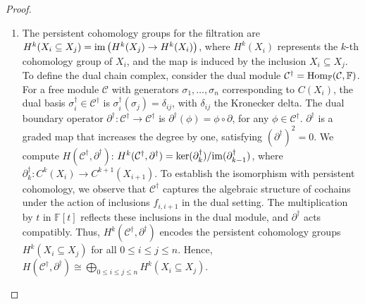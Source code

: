 \begin{proof}
\begin{enumerate}
\item The persistent cohomology groups for the filtration are $H^k(X_i \subseteq X_j) = \mathrm{im}\left( H^k(X_j) \to H^k(X_i) \right)$, where \( H^k(X_i) \) represents the \( k \)-th cohomology group of \( X_i \), and the map is induced by the inclusion \( X_i \subseteq X_j \). To define the dual chain complex, consider the dual module \( \mathcal{C}^\dagger = {\mathrm{Hom}}_{\mathbb{F}}(\mathcal{C}, {\mathbb{F}}) \). For a free module \( \mathcal{C} \) with generators \( \sigma_1, \ldots, \sigma_n \) corresponding to \( C(X_i) \), the dual basis \( \sigma_i^\dagger \in \mathcal{C}^\dagger \) is $\sigma_i^\dagger(\sigma_j) = \delta_{ij}$, with \( \delta_{ij} \) the Kronecker delta. The dual boundary operator \( \partial^\dagger: \mathcal{C}^\dagger \to \mathcal{C}^\dagger \) is $\partial^\dagger(\phi) = \phi \circ \partial$, for any \( \phi \in \mathcal{C}^\dagger \). \( \partial^\dagger \) is a graded map that increases the degree by one, satisfying \( (\partial^\dagger)^2 = 0 \). We compute \( H(\mathcal{C}^\dagger, \partial^\dagger) \): $H^k(\mathcal{C}^\dagger, \partial^\dagger) = \ker(\partial^\dagger_k) / \mathrm{im}(\partial^\dagger_{k-1})$, where \( \partial^\dagger_k: C^k(X_i) \to C^{k+1}(X_{i+1}) \). To establish the isomorphism with persistent cohomology, we observe that \( \mathcal{C}^\dagger \) captures the algebraic structure of cochains under the action of inclusions \( f_{i,i+1} \) in the dual setting. The multiplication by \( t \) in \( \mathbb{F}[t] \) reflects these inclusions in the dual module, and \( \partial^\dagger \) acts compatibly. Thus, \( H^k(\mathcal{C}^\dagger, \partial^\dagger) \) encodes the persistent cohomology groups \( H^k(X_i \subseteq X_j) \) for all \( 0 \leq i \leq j \leq n \). Hence, $H(\mathcal{C}^\dagger, \partial^\dagger) \cong \bigoplus_{0 \leq i \leq j \leq n} H^k(X_i \subseteq X_j)$.

\end{enumerate}
\end{proof}
